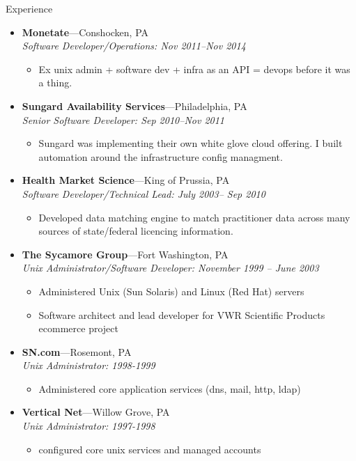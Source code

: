 \documentclass[11pt,oneside]{article}
\newenvironment{ressection}[1]{
        \vspace{4pt}
        {\fontfamily{phv}\selectfont\Large#1}
        \begin{itemize}
        \vspace{3pt}
}{
        \end{itemize}
}
\newcommand{\ressubitem}[1]{
        \vspace{-1pt}
        \item \begin{flushleft} #1 \end{flushleft}
}
\newcommand{\resbigitem}[3]{
        \vspace{-5pt}
        \item
        \textbf{#1}---#2 \\
        \textit{#3}
}
\newenvironment{ressubsec}[3]{
        \resbigitem{#1}{#2}{#3}
        \vspace{-2pt}
        \begin{itemize}
}{
        \end{itemize}
}
\begin{document}
\begin{ressection}{Experience}
        
        \begin{ressubsec}{Monetate}{Conshocken, PA}{Software Developer/Operations: Nov 2011--Nov 2014}

          \ressubitem{Ex unix admin + software dev + infra as an API = devops before it was a thing. }
        \end{ressubsec}


        \begin{ressubsec}{Sungard Availability Services}{Philadelphia, PA}{Senior Software Developer: Sep 2010--Nov 2011}

          \ressubitem{Sungard was implementing their own white glove cloud offering. I built automation around the infrastructure config managment. }
        \end{ressubsec}

        \begin{ressubsec}{Health Market Science}{King of Prussia, PA}{Software Developer/Technical Lead: July 2003-- Sep 2010}

          \ressubitem{Developed data matching engine to match practitioner data across many sources of state/federal licencing information.}
        \end{ressubsec}

        \begin{ressubsec}{The Sycamore Group}{Fort Washington, PA}{Unix Administrator/Software Developer: November 1999 -- June 2003}

          \ressubitem{Administered Unix (Sun Solaris) and Linux (Red Hat) servers}
          
          \ressubitem{Software architect and lead developer for VWR Scientific Products ecommerce project }


        \end{ressubsec}

        \begin{ressubsec}{SN.com}{Rosemont, PA}{Unix Administrator: 1998-1999}
          \ressubitem{Administered core application services (dns, mail, http, ldap)}
        \end{ressubsec}

        \begin{ressubsec}{Vertical Net}{Willow Grove, PA}{Unix Administrator: 1997-1998}
          \ressubitem{configured core unix services and managed accounts}
        \end{ressubsec}

\end{ressection}
\end{document}
